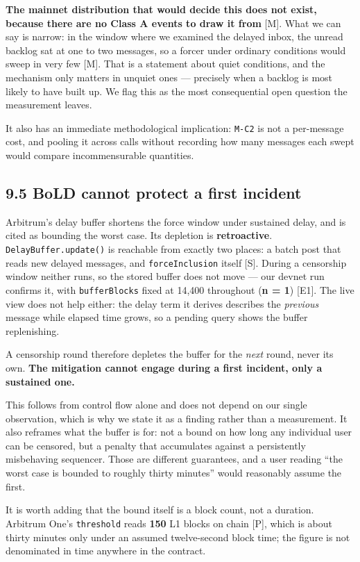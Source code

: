 \documentclass[conference]{IEEEtran}
\renewcommand{\_}{\textunderscore\allowbreak}
\begin{document}
\textbf{The mainnet distribution that would decide this does not exist,
because there are no Class A events to draw it from} {[}M{]}. What we
can say is narrow: in the window where we examined the delayed inbox,
the unread backlog sat at one to two messages, so a forcer under
ordinary conditions would sweep in very few {[}M{]}. That is a statement
about quiet conditions, and the mechanism only matters in unquiet ones
--- precisely when a backlog is most likely to have built up. We flag
this as the most consequential open question the measurement leaves.

It also has an immediate methodological implication: \texttt{M-C2} is
not a per-message cost, and pooling it across calls without recording
how many messages each swept would compare incommensurable quantities.

\subsection{9.5 BoLD cannot protect a first
incident}\label{bold-cannot-protect-a-first-incident}

Arbitrum's delay buffer shortens the force window under sustained delay,
and is cited as bounding the worst case. Its depletion is
\textbf{retroactive}. \texttt{DelayBuffer.update()} is reachable from
exactly two places: a batch post that reads new delayed messages, and
\texttt{forceInclusion} itself {[}S{]}. During a censorship window
neither runs, so the stored buffer does not move --- our devnet run
confirms it, with \texttt{bufferBlocks} fixed at 14,400 throughout
(\textbf{n = 1}) {[}E1{]}. The live view does not help either: the delay
term it derives describes the \emph{previous} message while elapsed time
grows, so a pending query shows the buffer replenishing.

A censorship round therefore depletes the buffer for the \emph{next}
round, never its own. \textbf{The mitigation cannot engage during a
first incident, only a sustained one.}

This follows from control flow alone and does not depend on our single
observation, which is why we state it as a finding rather than a
measurement. It also reframes what the buffer is for: not a bound on how
long any individual user can be censored, but a penalty that accumulates
against a persistently misbehaving sequencer. Those are different
guarantees, and a user reading ``the worst case is bounded to roughly
thirty minutes'' would reasonably assume the first.

It is worth adding that the bound itself is a block count, not a
duration. Arbitrum One's \texttt{threshold} reads \textbf{150} L1 blocks
on chain {[}P{]}, which is about thirty minutes only under an assumed
twelve-second block time; the figure is not denominated in time anywhere
in the contract.
\end{document}
